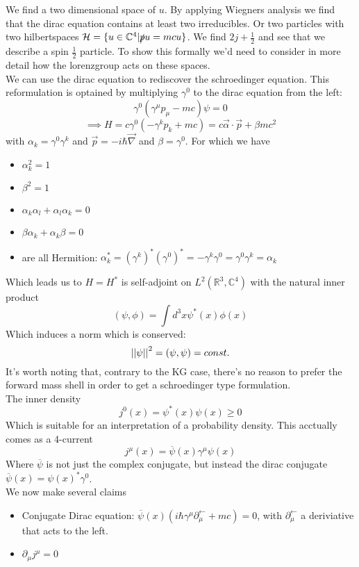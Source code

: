 \documentclass{report}
\begin{document}
We find a two dimensional space of $u$. By applying Wiegners analysis we find that the dirac equation contains at least two irreducibles. Or two particles with two hilbertspaces $\mathcal{H} = \{ u \in \mathbb{C}^{4} | \slashed{p} u = mcu\}$. We find $2j + \frac{1}{2}$ and see that we describe a spin $\frac{1}{2}$ particle. To show this formally we'd need to consider in more detail how the lorenzgroup acts on these spaces.\\
We can use the dirac equation to rediscover the schroedinger equation. This reformulation is optained by multiplying $\gamma^0$ to the dirac equation from the left: \[
  \gamma^0 \left( \gamma^\mu p_\mu - mc \right) \psi =0
\] \[
\implies H = c \gamma^0 \left( -\gamma^k p_k + mc \right) = c \vec{\alpha}\cdot \vec{p} + \beta m c^2
\] 
with $\alpha_k = \gamma^0 \gamma^k$ and $\vec{p} = - i \hbar \vec{\nabla}$ and $\beta = \gamma^0$. For which we have
\begin{itemize}
  \item $\alpha_k^2 = 1$ 
  \item $\beta^2 = 1$
  \item $\alpha_k \alpha_l + \alpha_l \alpha_k = 0$
  \item $\beta \alpha_k + \alpha_k \beta = 0$
  \item are all Hermition: $\alpha_k^* = \left( \gamma^k \right) ^* \left( \gamma^0 \right) ^* = - \gamma^k \gamma^0 = \gamma^0 \gamma^k = \alpha_k$
\end{itemize}
Which leads us to $H = H^*$ is self-adjoint on $L^2\left( \mathbb{R}^{3}, \mathbb{C}^{4} \right) $ with the natural inner product \[
  \left( \psi, \phi \right) = \int d^{3}x \psi^*\left( x \right) \phi\left( x \right) 
\] 
Which induces a norm which is conserved: \[
  \abs{\abs{\psi}}^2 = \left( \psi, \psi \right) = const.
\] 
It's worth noting that, contrary to the KG case, there's no reason to prefer the forward mass shell in order to get a schroedinger type formulation.\\
The inner density \[
  j^0\left( x \right) = \psi^*\left( x \right) \psi\left( x \right) \ge 0
\] Which is suitable for an interpretation of a probability density. This acctually comes as a 4-current \[
j^ \mu\left( x \right) = \overline{\psi}\left( x \right) \gamma^ \mu \psi\left( x \right) 
\] Where $\overline{\psi}$ is not just the complex conjugate, but instead the dirac conjugate $\overline{\psi}\left( x  \right) = \psi\left( x \right) ^* \gamma^0$.\\
We now make several claims
\begin{itemize}
  \item Conjugate Dirac equation: $\overline{\psi}\left( x \right) \left( i \hbar \gamma^\mu \partial^{\leftarrow}_\mu + mc  \right) = 0$, with $\partial^{\leftarrow}_\mu $ a deriviative that acts to the left.
  \item $\partial_\mu j^\mu = 0 $
\end{itemize}
\end{document}
